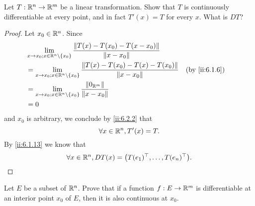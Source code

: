 \exercisesection

\begin{ex}\label{ii:ex:6.4.1}
  Let \(T : \mathbb{R}^n \to \mathbb{R}^m\) be a linear transformation.
  Show that \(T\) is continuously differentiable at every point, and in fact \(T'(x) = T\) for every \(x\).
  What is \(D T\)?
\end{ex}

\begin{proof}
  Let \(x_0 \in \mathbb{R}^n\).
  Since
  \begin{align*}
     & \lim_{x \to x_0 ; x \in \R^n \setminus \set{x_0}} \dfrac{\norm*{T(x) - T(x_0) - T(x - x_0)}}{\norm*{x - x_0}}                      \\
     & = \lim_{x \to x_0 ; x \in \R^n \setminus \set{x_0}} \dfrac{\norm*{T(x) - T(x_0) - T(x) - T(x_0)}}{\norm*{x - x_0}} &  & \by{ii:6.1.6} \\
     & = \lim_{x \to x_0 ; x \in \R^n \setminus \set{x_0}} \dfrac{\norm*{0_{\R^m}}}{\norm*{x - x_0}}                                      \\
     & = 0
  \end{align*}
  and \(x_0\) is arbitrary, we conclude by \cref{ii:6.2.2} that
  \[
    \forall x \in \mathbb{R}^n, T'(x) = T.
  \]
  By \cref{ii:6.1.13} we know that
  \[
    \forall x \in \mathbb{R}^n, D T(x) = \big(T(e_1)^\top, \dots, T(e_n)^\top\big).
  \]
\end{proof}

\begin{ex}\label{ii:ex:6.4.2}
  Let \(E\) be a subset of \(\mathbb{R}^n\).
  Prove that if a function \(f : E \to \mathbb{R}^m\) is differentiable at an interior point \(x_0\) of \(E\), then it is also continuous at \(x_0\).
\end{ex}

